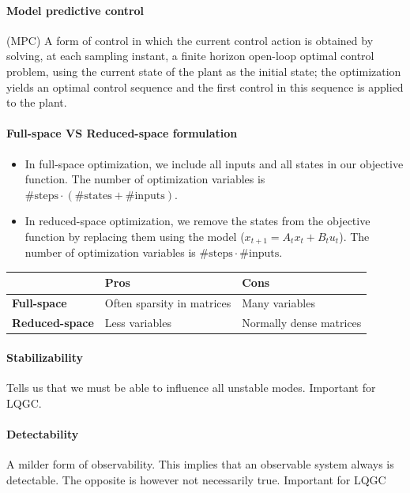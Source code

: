 \paragraph{Model predictive control} (MPC) A form of control in which the current control action is obtained by solving, at each sampling instant, a finite horizon open-loop optimal control problem, using the current state of the plant as the initial state; the optimization yields an optimal control sequence and the first control in this sequence is applied to the plant.

\paragraph{Full-space VS Reduced-space formulation}  
 \begin{itemize}[nolistsep,noitemsep]
     \item In full-space optimization, we include all inputs and all states in our objective function. The number of optimization variables is $\#\mathrm{steps} \cdot (\#\mathrm{states} + \#\mathrm{inputs})$.
     \item In reduced-space optimization, we remove the states from the objective function by replacing them using the model ($x_{t+1} = A_t x_t + B_t u_t$). The number of optimization variables is $\#\mathrm{steps} \cdot \#\mathrm{inputs}$.
 \end{itemize}
 
\hskip-0.5cm
\begin{tabularx}{\linewidth}{X X X}
	& \textbf{Pros} & \textbf{Cons}\\
	\hline
	\textbf{Full-space} & Often sparsity in matrices & Many variables\\
	\textbf{Reduced-space} & Less variables & Normally dense matrices
\end{tabularx}

\paragraph{Stabilizability} 
Tells us that we must be able to influence all unstable modes. Important for LQGC.

\paragraph{Detectability}
A milder form of observability. This implies that an
observable system always is detectable. The opposite is however not
necessarily true. Important for LQGC